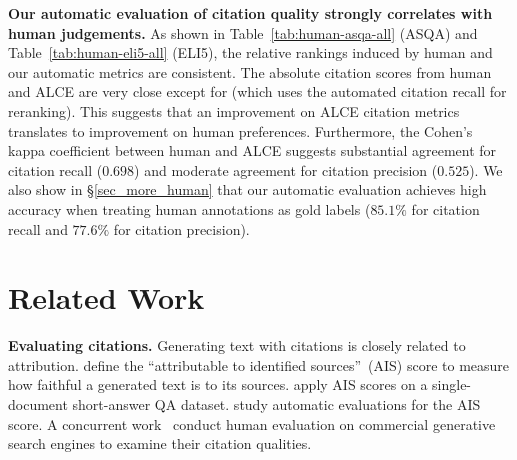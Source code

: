\documentclass[11pt]{article}
\renewcommand{\paragraph}[1]{\vspace{0.2cm}\noindent\textbf{#1}}
\newcommand{\rerank}{{\sc{Rerank}}}
\newcommand{\citeeval}{ALCE}
\begin{document}
\paragraph{Our automatic evaluation of citation quality strongly correlates with human judgements.}
As shown in Table~\ref{tab:human-asqa-all} (ASQA) and Table~\ref{tab:human-eli5-all} (ELI5),
the relative rankings induced by human and our automatic metrics are consistent.
The absolute citation scores from human and \citeeval{} are very close except for \rerank{} (which uses the automated citation recall for reranking).
This suggests that an improvement on \citeeval{} citation metrics translates to improvement on human preferences. %
Furthermore, the Cohen's kappa coefficient between 
human and \citeeval{} suggests substantial agreement for citation recall ($0.698$) and moderate agreement for citation precision ($0.525$).
We also show in \S\ref{sec_more_human} that our automatic evaluation achieves high accuracy when treating human annotations as gold labels
($85.1\%$ for citation recall and $77.6\%$ for citation precision).












% 


\section{Related Work}
\label{sec:related_work}
\vspace{-5pt}

\paragraph{Evaluating citations.}
Generating text with citations is closely related to attribution.
\citet{rashkin2021measuring} define the ``attributable to identified sources''~(AIS) score to measure how faithful a generated text is to its sources.
\citet{bohnet2022attributed} apply AIS scores on a single-document short-answer QA dataset.
\citet{honovich-etal-2022-true-evaluating,yue2023automatic} study  automatic evaluations for the AIS score.
A concurrent work~\citep{liu2023evaluating} 
conduct human evaluation on commercial generative search engines  to
examine their citation qualities.
\end{document}
